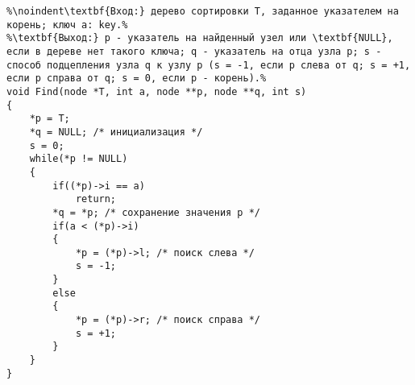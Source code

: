 \documentclass{article}
\begin{document}
\begin{lstlisting}[escapechar=\%]
%1. Поиск узла - функция Find.%
%\noindent\textbf{Вход:} дерево сортировки T, заданное указателем на корень; ключ a: key.%
%\textbf{Выход:} p - указатель на найденный узел или \textbf{NULL}, если в дереве нет такого ключа; q - указатель на отца узла p; s - способ подцепления узла q к узлу p (s = -1, если p слева от q; s = +1, если p справа от q; s = 0, если p - корень).%
void Find(node *T, int a, node **p, node **q, int s)
{
	*p = T;
	*q = NULL; /* инициализация */
	s = 0;
	while(*p != NULL)
	{
		if((*p)->i == a)
			return;
		*q = *p; /* сохранение значения p */
		if(a < (*p)->i)
		{
			*p = (*p)->l; /* поиск слева */
			s = -1;
		}
		else
		{
			*p = (*p)->r; /* поиск справа */
			s = +1;
		}
	}
}
\end{lstlisting}
\end{document}

